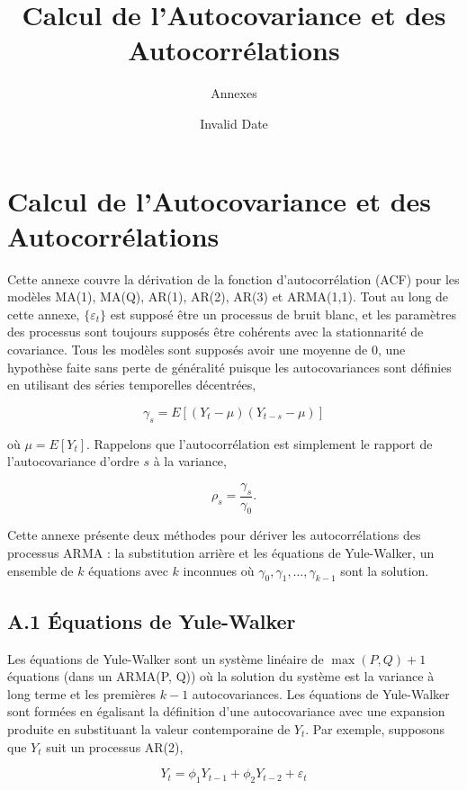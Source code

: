 \documentclass[
  letterpaper,
  DIV=11,
  numbers=noendperiod]{scrartcl}
\title{Calcul de l'Autocovariance et des Autocorrélations}
\author{Annexes}
\date{Invalid Date}
\begin{document}
\maketitle


\section{Calcul de l'Autocovariance et des
Autocorrélations}\label{calcul-de-lautocovariance-et-des-autocorruxe9lations}

Cette annexe couvre la dérivation de la fonction d'autocorrélation (ACF)
pour les modèles MA(1), MA(Q), AR(1), AR(2), AR(3) et ARMA(1,1). Tout au
long de cette annexe, \(\{ \varepsilon_t \}\) est supposé être un
processus de bruit blanc, et les paramètres des processus sont toujours
supposés être cohérents avec la stationnarité de covariance. Tous les
modèles sont supposés avoir une moyenne de 0, une hypothèse faite sans
perte de généralité puisque les autocovariances sont définies en
utilisant des séries temporelles décentrées,

\[
\gamma_s = E[(Y_t - \mu)(Y_{t-s} - \mu)]
\]

où \(\mu = E[Y_t]\). Rappelons que l'autocorrélation est simplement le
rapport de l'autocovariance d'ordre \(s\) à la variance,

\[
\rho_s = \frac{\gamma_s}{\gamma_0}.
\]

Cette annexe présente deux méthodes pour dériver les autocorrélations
des processus ARMA : la substitution arrière et les équations de
Yule-Walker, un ensemble de \(k\) équations avec \(k\) inconnues où
\(\gamma_0, \gamma_1, \ldots, \gamma_{k-1}\) sont la solution.

\subsection{A.1 Équations de
Yule-Walker}\label{a.1-uxe9quations-de-yule-walker}

Les équations de Yule-Walker sont un système linéaire de
\(\max(P, Q) + 1\) équations (dans un ARMA(P, Q)) où la solution du
système est la variance à long terme et les premières \(k-1\)
autocovariances. Les équations de Yule-Walker sont formées en égalisant
la définition d'une autocovariance avec une expansion produite en
substituant la valeur contemporaine de \(Y_t\). Par exemple, supposons
que \(Y_t\) suit un processus AR(2),

\[
Y_t = \phi_1 Y_{t-1} + \phi_2 Y_{t-2} + \varepsilon_t
\]
\end{document}
